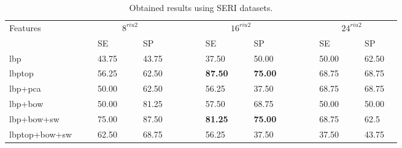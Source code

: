 \begin{tiny}
  \begin{table}[b]
\caption{Obtained results using SERI datasets.}%
\centering
\begin{tabular}{lcclcclcccclcclcccclcclc}
\toprule
Features 	& & &\multicolumn{4}{c}{$8^{riu2}$}&	 & & & &\multicolumn{4}{c}{$16^{riu2}$}& & & & &\multicolumn{4}{c}{$24^{riu2}$} &\\
  \cmidrule(l){2-8}  \cmidrule(l){10-16}  \cmidrule(l){18-24}
	       & & & SE & & & SP & & & & & SE & & & SP & & & & & SE & & & SP & \\
\midrule
  	\ac{lbp}					& & & 43.75 & & & 43.75 & & & & & 37.50 & & & 50.00 & & & & & 50.00 & & & 62.50 & \\
 	\ac{lbptop}				& & & 56.25 & & & 62.50 & & & & & \textbf{87.50} & & & \textbf{75.00} & & & & & 68.75 & & & 68.75 & \\
	\ac{lbp}+\ac{pca}		& & & 50.00 & & & 62.50 & & & & & 56.25 & & & 37.50 & & & & & 68.75 & & & 68.75 & \\
	\ac{lbp}+\ac{bow}		& & & 50.00 & & & 81.25 & & & & & 57.50 & & & 68.75 & & & & & 50.00 & & & 50.00 & \\
	\ac{lbp}+\ac{bow}+\acs{sw}		& & & 75.00 & & & 87.50 & & & & & \textbf{81.25} & & & \textbf{75.00} & & & & & 68.75 & & & 62.5 & \\
	\ac{lbptop}+\ac{bow}+\acs{sw}		& & & 62.50 & & & 68.75 & & & & & 56.25 & & & 37.50 & & & & & 37.50 & & & 43.75 & \\
\bottomrule
\end{tabular}
\label{tab:Table1}
\end{table}
\end{tiny}